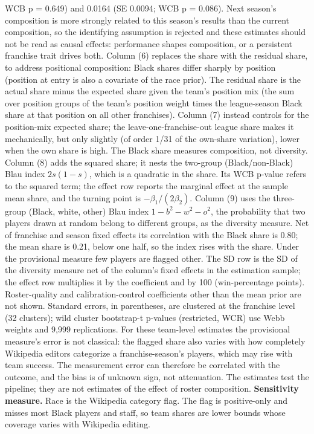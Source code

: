 \begin{table}[!h]
{\begin{threeparttable}
\begin{tablenotes}[para]
WCB p = 0.649) and 0.0164 (SE 0.0094; WCB p = 0.086). Next season's composition is more strongly related to this season's results than the current composition, so the identifying assumption is rejected and these estimates should not be read as causal effects: performance shapes composition, or a persistent franchise trait drives both. Column (6) replaces the share with the residual share, to address positional composition: Black shares differ sharply by position (position at entry is also a covariate of the race prior). The residual share is the actual share minus the expected share given the team's position mix (the sum over position groups of the team's position weight times the league-season Black share at that position on all other franchises). Column (7) instead controls for the position-mix expected share; the leave-one-franchise-out league share makes it mechanically, but only slightly (of order 1/31 of the own-share variation), lower when the own share is high. The Black share measures composition, not diversity. Column (8) adds the squared share; it nests the two-group (Black/non-Black) Blau index $2s(1-s)$, which is a quadratic in the share. Its WCB p-value refers to the squared term; the effect row reports the marginal effect at the sample mean share, and the turning point is $-\beta_1/(2\beta_2)$. Column (9) uses the three-group (Black, white, other) Blau index $1 - b^2 - w^2 - o^2$, the probability that two players drawn at random belong to different groups, as the diversity measure. Net of franchise and season fixed effects its correlation with the Black share is 0.80; the mean share is 0.21, below one half, so the index rises with the share. Under the provisional measure few players are flagged other. The SD row is the SD of the diversity measure net of the column's fixed effects in the estimation sample; the effect row multiplies it by the coefficient and by 100 (win-percentage points). Roster-quality and calibration-control coefficients other than the mean prior are not shown. Standard errors, in parentheses, are clustered at the franchise level (32 clusters); wild cluster bootstrap-t p-values (restricted, WCR) use Webb weights and 9,999 replications. For these team-level estimates the provisional measure's error is not classical: the flagged share also varies with how completely Wikipedia editors categorize a franchise-season's players, which may rise with team success. The measurement error can therefore be correlated with the outcome, and the bias is of unknown sign, not attenuation. The estimates test the pipeline; they are not estimates of the effect of roster composition. \textbf{Sensitivity measure.} Race is the Wikipedia category flag. The flag is positive-only and misses most Black players and staff, so team shares are lower bounds whose coverage varies with Wikipedia editing.
\end{tablenotes}
\end{threeparttable}}
\end{table}
